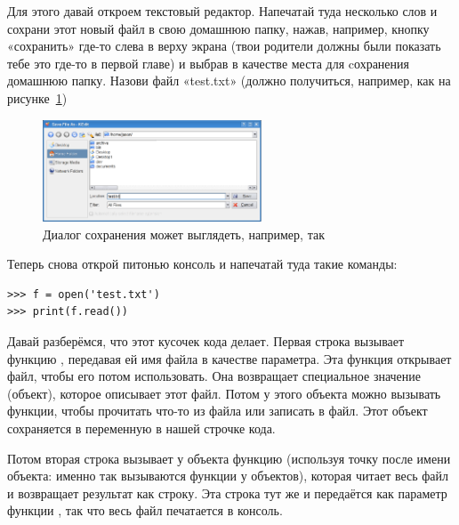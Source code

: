 \begin{LINUX}
Для этого давай откроем текстовый редактор. Напечатай туда несколько слов и сохрани этот новый файл в свою домашнюю папку, нажав, например, кнопку «сохранить» где-то слева в верху экрана (твои родители должны были показать тебе это где-то в первой главе) и выбрав в качестве места для cохранения домашнюю папку. Назови файл «test.txt» (должно получиться, например, как на рисунке~\ref{fig19})
	
\begin{figure}
\begin{center}
\includegraphics[width=65mm]{../en/figure19.eps}
\end{center}
\caption{Диалог сохранения может выглядеть, например, так}\label{fig19}
\end{figure}

Теперь снова открой питонью консоль и напечатай туда такие команды:

\begin{listing}
\begin{verbatim}
>>> f = open('test.txt')
>>> print(f.read())
\end{verbatim}
\end{listing}

\end{LINUX}

Давай разберёмся, что этот кусочек кода делает. Первая строка вызывает функцию , передавая ей имя файла в качестве параметра. Эта функция открывает файл, чтобы его потом использовать. Она возвращает специальное значение (объект), которое описывает этот файл. Потом у этого объекта можно вызывать функции, чтобы прочитать что-то из файла или записать в файл. Этот объект сохраняется в переменную  в нашей строчке кода.

Потом вторая строка вызывает у объекта  функцию  (используя точку после имени объекта: именно так вызываются функции у объектов), которая читает весь файл и возвращает результат как строку. Эта строка тут же и передаётся как параметр функции , так что весь файл печатается в консоль.

\vspace{6pt}
\begin{center}
\end{center}

